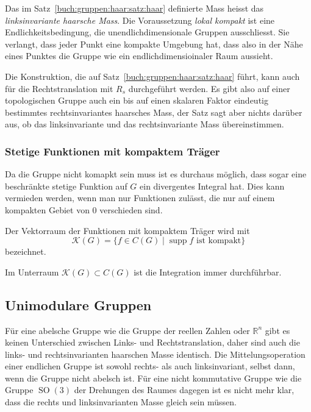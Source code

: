 Das im Satz~\ref{buch:gruppen:haar:satz:haar} definierte Mass
heisst das {\em linksinvariante haarsche Mass}.
Die Voraussetzung {\em lokal kompakt} ist eine Endlichkeitsbedingung,
die unendlichdimensionale Gruppen ausschliesst.
Sie verlangt, dass jeder Punkt eine kompakte Umgebung hat, dass also
in der Nähe eines Punktes die Gruppe wie ein endlichdimensioinaler 
Raum aussieht.

Die Konstruktion, die auf Satz~\ref{buch:gruppen:haar:satz:haar}
führt, kann auch für die Rechtstranslation mit $R_s$ durchgeführt
werden.
Es gibt also auf einer topologischen Gruppe auch ein bis auf einen
skalaren Faktor eindeutig bestimmtes rechtsinvariantes haarsches Mass,
der Satz sagt aber nichts darüber aus, ob das linksinvariante und das
rechtsinvariante Mass übereinstimmen.

%
%
\subsubsection{Stetige Funktionen mit kompaktem Träger}
Da die Gruppe nicht komapkt sein muss ist es durchaus möglich,
dass sogar eine beschränkte stetige Funktion auf $G$ ein divergentes
Integral hat.
Dies kann vermieden werden, wenn man nur Funktionen zulässt, die
nur auf einem kompakten Gebiet von $0$ verschieden sind.

\begin{definition}
Der Vektorraum der Funktionen mit kompaktem Träger wird mit
\[
\mathscr{K}(G)
=
\{ f\in C(G)\mid \text{$\operatorname{supp}f $ ist kompakt}\}
\]
bezeichnet.
\end{definition}

Im Unterraum $\mathscr{K}(G)\subset C(G)$ ist die Integration
immer durchführbar.

%
%
\subsection{Unimodulare Gruppen
\label{buch:haar:subsection:unimodular}}
Für eine abelsche Gruppe wie die Gruppe der reellen Zahlen
oder $\mathbb{R}^n$ gibt es keinen Unterschied zwischen Links- und
Rechtstranslation, daher sind auch die links- und rechtsinvarianten
haarschen Masse identisch.
Die Mittelungsoperation einer endlichen Gruppe ist sowohl rechts-
als auch linksinvariant, selbst dann, wenn die Gruppe nicht abelsch
ist.
Für eine nicht kommutative Gruppe wie die Gruppe $\operatorname{SO}(3)$
der Drehungen des Raumes dagegen ist es nicht mehr klar, dass 
die rechts und linksinvarianten Masse gleich sein müssen.

